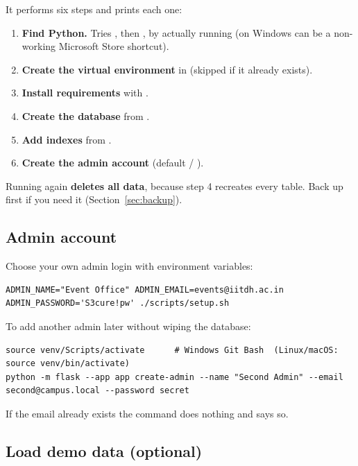\documentclass[11pt,a4paper]{article}
\begin{document}
It performs six steps and prints each one:

\begin{enumerate}
  \item \textbf{Find Python.} Tries , then , by actually running
         (on Windows  can be a non-working Microsoft Store shortcut).
  \item \textbf{Create the virtual environment} in  (skipped if it already exists).
  \item \textbf{Install requirements} with .
  \item \textbf{Create the database}  from .
  \item \textbf{Add indexes} from .
  \item \textbf{Create the admin account} (default  / ).
\end{enumerate}

\begin{warning}
Running  again \textbf{deletes all data}, because step 4 recreates every table.
Back up  first if you need it (Section~\ref{sec:backup}).
\end{warning}

\subsection{Admin account}
\label{sec:admin}

Choose your own admin login with environment variables:

\begin{lstlisting}[style=shell]
ADMIN_NAME="Event Office" ADMIN_EMAIL=events@iitdh.ac.in ADMIN_PASSWORD='S3cure!pw' ./scripts/setup.sh
\end{lstlisting}

To add another admin later without wiping the database:

\begin{lstlisting}[style=shell]
source venv/Scripts/activate      # Windows Git Bash  (Linux/macOS: source venv/bin/activate)
python -m flask --app app create-admin --name "Second Admin" --email second@campus.local --password secret
\end{lstlisting}

If the email already exists the command does nothing and says so.

\subsection{Load demo data (optional)}
\end{document}
